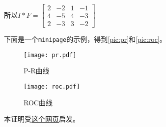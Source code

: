 \documentclass{dreamClass}
\begin{document}
所以\(I * F = \begin{bmatrix}
    2 & -2  & 1 & - 1 \\
    4 & - 5 & 4 & - 3 \\
    2 & - 3 & 3 & - 2
\end{bmatrix}\)

下面是一个\texttt{minipage}的示例，得到\autoref{pic:pr}和\autoref{pic:roc}。
\begin{figure}
    \centering
    \begin{minipage}{.5\textwidth}
        \centering
        \texttt{[image: pr.pdf]}
        \caption{P-R曲线\label{pic:pr}}
    \end{minipage}%
    \begin{minipage}{.5\textwidth}
        \centering
        \texttt{[image: roc.pdf]}
        \caption{ROC曲线\label{pic:roc}}
    \end{minipage}
\end{figure}

本证明受\href{https://datawhalechina.github.io/pumpkin-book/#/chapter2/chapter2?id=221}{这个网页}启发。
\end{document}
